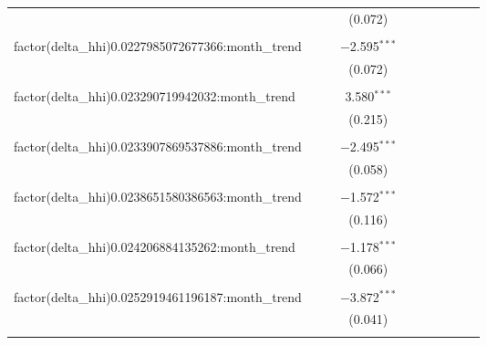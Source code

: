 \begin{table}[H]
{\begin{tabular}{@{\extracolsep{5pt}}lccccccccc}
   &  &  & (0.072) &  &  &  &  &  &  \\  

   & & & & & & & & & \\  

  factor(delta\_hhi)0.0227985072677366:month\_trend &  &  & $-$2.595$^{***}$ &  &  &  &  &  &  \\  

   &  &  & (0.072) &  &  &  &  &  &  \\  

   & & & & & & & & & \\  

  factor(delta\_hhi)0.023290719942032:month\_trend &  &  & 3.580$^{***}$ &  &  &  &  &  &  \\  

   &  &  & (0.215) &  &  &  &  &  &  \\  

   & & & & & & & & & \\  

  factor(delta\_hhi)0.0233907869537886:month\_trend &  &  & $-$2.495$^{***}$ &  &  &  &  &  &  \\  

   &  &  & (0.058) &  &  &  &  &  &  \\  

   & & & & & & & & & \\  

  factor(delta\_hhi)0.0238651580386563:month\_trend &  &  & $-$1.572$^{***}$ &  &  &  &  &  &  \\  

   &  &  & (0.116) &  &  &  &  &  &  \\  

   & & & & & & & & & \\  

  factor(delta\_hhi)0.024206884135262:month\_trend &  &  & $-$1.178$^{***}$ &  &  &  &  &  &  \\  

   &  &  & (0.066) &  &  &  &  &  &  \\  

   & & & & & & & & & \\  

  factor(delta\_hhi)0.0252919461196187:month\_trend &  &  & $-$3.872$^{***}$ &  &  &  &  &  &  \\  

   &  &  & (0.041) &  &  &  &  &  &  \\  

   & & & & & & & & & \\  


\end{tabular}}
\end{table}
